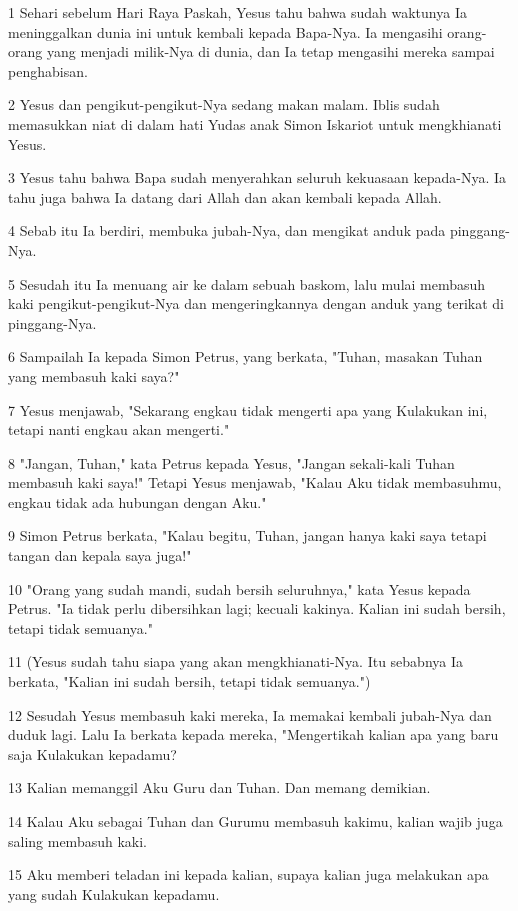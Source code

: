 \par 1 Sehari sebelum Hari Raya Paskah, Yesus tahu bahwa sudah waktunya Ia meninggalkan dunia ini untuk kembali kepada Bapa-Nya. Ia mengasihi orang-orang yang menjadi milik-Nya di dunia, dan Ia tetap mengasihi mereka sampai penghabisan.
\par 2 Yesus dan pengikut-pengikut-Nya sedang makan malam. Iblis sudah memasukkan niat di dalam hati Yudas anak Simon Iskariot untuk mengkhianati Yesus.
\par 3 Yesus tahu bahwa Bapa sudah menyerahkan seluruh kekuasaan kepada-Nya. Ia tahu juga bahwa Ia datang dari Allah dan akan kembali kepada Allah.
\par 4 Sebab itu Ia berdiri, membuka jubah-Nya, dan mengikat anduk pada pinggang-Nya.
\par 5 Sesudah itu Ia menuang air ke dalam sebuah baskom, lalu mulai membasuh kaki pengikut-pengikut-Nya dan mengeringkannya dengan anduk yang terikat di pinggang-Nya.
\par 6 Sampailah Ia kepada Simon Petrus, yang berkata, "Tuhan, masakan Tuhan yang membasuh kaki saya?"
\par 7 Yesus menjawab, "Sekarang engkau tidak mengerti apa yang Kulakukan ini, tetapi nanti engkau akan mengerti."
\par 8 "Jangan, Tuhan," kata Petrus kepada Yesus, "Jangan sekali-kali Tuhan membasuh kaki saya!" Tetapi Yesus menjawab, "Kalau Aku tidak membasuhmu, engkau tidak ada hubungan dengan Aku."
\par 9 Simon Petrus berkata, "Kalau begitu, Tuhan, jangan hanya kaki saya tetapi tangan dan kepala saya juga!"
\par 10 "Orang yang sudah mandi, sudah bersih seluruhnya," kata Yesus kepada Petrus. "Ia tidak perlu dibersihkan lagi; kecuali kakinya. Kalian ini sudah bersih, tetapi tidak semuanya."
\par 11 (Yesus sudah tahu siapa yang akan mengkhianati-Nya. Itu sebabnya Ia berkata, "Kalian ini sudah bersih, tetapi tidak semuanya.")
\par 12 Sesudah Yesus membasuh kaki mereka, Ia memakai kembali jubah-Nya dan duduk lagi. Lalu Ia berkata kepada mereka, "Mengertikah kalian apa yang baru saja Kulakukan kepadamu?
\par 13 Kalian memanggil Aku Guru dan Tuhan. Dan memang demikian.
\par 14 Kalau Aku sebagai Tuhan dan Gurumu membasuh kakimu, kalian wajib juga saling membasuh kaki.
\par 15 Aku memberi teladan ini kepada kalian, supaya kalian juga melakukan apa yang sudah Kulakukan kepadamu.
